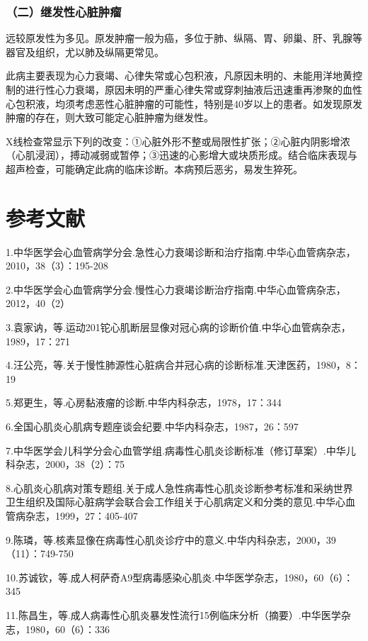 \subsubsection{（二）继发性心脏肿瘤}

远较原发性为多见。原发肿瘤一般为癌，多位于肺、纵隔、胃、卵巢、肝、乳腺等器官及组织，尤以肺及纵隔更常见。

此病主要表现为心力衰竭、心律失常或心包积液，凡原因未明的、未能用洋地黄控制的进行性心力衰竭，原因未明的严重心律失常或穿刺抽液后迅速重再渗聚的血性心包积液，均须考虑恶性心脏肿瘤的可能性，特别是40岁以上的患者。如发现原发肿瘤的存在，则大致可能定心脏肿瘤为继发性。

X线检查常显示下列的改变：①心脏外形不整或局限性扩张；②心脏内阴影增浓（心肌浸润），搏动减弱或暂停；③迅速的心影增大或块质形成。结合临床表现与超声检查，可能确定此病的临床诊断。本病预后恶劣，易发生猝死。

\protect\hypertarget{text00143.html}{}{}

\section{参考文献}

1.中华医学会心血管病学分会.急性心力衰竭诊断和治疗指南.中华心血管病杂志，2010，38（3）：195-208

2.中华医学会心血管病学分会.慢性心力衰竭诊断治疗指南.中华心血管病杂志，2012，40（2）

3.袁家讷，等.运动201铊心肌断层显像对冠心病的诊断价值.中华心血管病杂志，1989，17：271

4.汪公亮，等.关于慢性肺源性心脏病合并冠心病的诊断标准.天津医药，1980，8：19

5.郑更生，等.心房黏液瘤的诊断.中华内科杂志，1978，17：344

6.全国心肌炎心肌病专题座谈会纪要.中华内科杂志，1987，26：597

7.中华医学会儿科学分会心血管学组.病毒性心肌炎诊断标准（修订草案）.中华儿科杂志，2000，38（2）：75

8.心肌炎心肌病对策专题组.关于成人急性病毒性心肌炎诊断参考标准和采纳世界卫生组织及国际心脏病学会联合会工作组关于心肌病定义和分类的意见.中华心血管病杂志，1999，27：405-407

9.陈璘，等.核素显像在病毒性心肌炎诊疗中的意义.中华内科杂志，2000，39（11）：749-750

10.苏诚钦，等.成人柯萨奇A9型病毒感染心肌炎.中华医学杂志，1980，60（6）：345

11.陈昌生，等.成人病毒性心肌炎暴发性流行15例临床分析（摘要）.中华医学杂志，1980，60（6）：336

